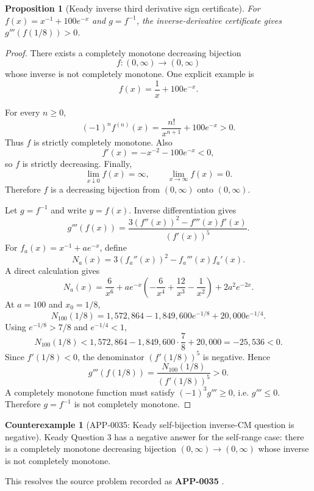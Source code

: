 \documentclass[11pt]{article}
\numberwithin{equation}{section}
\newtheorem{proposition}[theorem]{Proposition}
\theoremstyle{definition}
\newtheorem{counterexample}[theorem]{Counterexample}
\theoremstyle{remark}
\newcommand{\1}{\mathbf 1}
\begin{document}
\begin{proposition}[Keady inverse third derivative sign certificate]
\label{res:keady-inverse-third-derivative-sign-certificate}
For \(f(x)=x^{-1}+100e^{-x}\) and \(g=f^{-1}\), the inverse-derivative certificate gives \(g'''(f(1/8))>0\).
\end{proposition}

\begin{proof}
There exists a completely monotone decreasing bijection
\[
f:(0,\infty)\to(0,\infty)
\]
whose inverse is not completely monotone. One explicit example is
\[
f(x)=\frac1x+100e^{-x}.
\]

For every \(n\ge0\),
\[
(-1)^n f^{(n)}(x)=\frac{n!}{x^{n+1}}+100e^{-x}>0.
\]
Thus \(f\) is strictly completely monotone. Also
\[
f'(x)=-x^{-2}-100e^{-x}<0,
\]
so \(f\) is strictly decreasing. Finally,
\[
\lim_{x\downarrow0}f(x)=\infty,
\qquad
\lim_{x\to\infty}f(x)=0.
\]
Therefore \(f\) is a decreasing bijection from \((0,\infty)\) onto \((0,\infty)\).

Let \(g=f^{-1}\) and write \(y=f(x)\). Inverse differentiation gives
\[
g'''(f(x))=\frac{3(f''(x))^2-f'''(x)f'(x)}{(f'(x))^5}.
\]
For \(f_a(x)=x^{-1}+ae^{-x}\), define
\[
N_a(x)=3(f_a''(x))^2-f_a'''(x)f_a'(x).
\]
A direct calculation gives
\[
N_a(x)=\frac6{x^6}+ae^{-x}\left(-\frac6{x^4}+\frac{12}{x^3}-\frac1{x^2}\right)+2a^2e^{-2x}.
\]
At \(a=100\) and \(x_0=1/8\),
\[
N_{100}(1/8)=1{,}572{,}864-1{,}849{,}600e^{-1/8}+20{,}000e^{-1/4}.
\]
Using \(e^{-1/8}>7/8\) and \(e^{-1/4}<1\),
\[
N_{100}(1/8)<1{,}572{,}864-1{,}849{,}600\cdot\frac78+20{,}000=-25{,}536<0.
\]
Since \(f'(1/8)<0\), the denominator \((f'(1/8))^5\) is negative. Hence
\[
g'''(f(1/8))=\frac{N_{100}(1/8)}{(f'(1/8))^5}>0.
\]
A completely monotone function must satisfy \((-1)^3g'''\ge0\), i.e. \(g'''\le0\). Therefore \(g=f^{-1}\) is not completely monotone.
\end{proof}

\begin{counterexample}[APP-0035: Keady self-bijection inverse-CM question is negative]
\label{res:keady-q3-self-bijection-inverse-cm-negative-answer}
Keady Question 3 has a negative answer for the self-range case: there is a completely monotone decreasing bijection \((0,\infty)\to(0,\infty)\) whose inverse is not completely monotone.



This resolves the source problem recorded as \textbf{APP-0035} \cite{app-app-0035-source}.
\end{counterexample}
\end{document}
